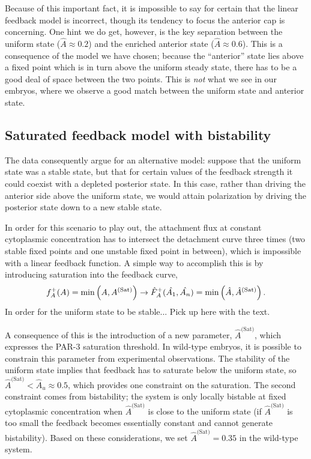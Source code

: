 \documentclass[11pt]{article}
\newcommand{\red}[1]{\color{red}#1\normalcolor}
\newcommand{\6}[1]{#1_{\text{6}}}
\newcommand{\3}[1]{#1_{\text{3}}}
\newcommand{\Sat}[1]{#1^\text{(Sat)}}
\begin{document}
Because of this important fact, it is impossible to say for certain that the linear feedback model is incorrect, though its tendency to focus the anterior cap is concerning. One hint we do get, however, is the key separation between the uniform state ($\hat A \approx 0.2$) and the enriched anterior state ($\hat A \approx 0.6$). This is a consequence of the model we have chosen; because the ``anterior'' state lies above a fixed point which is in turn above the uniform steady state, there has to be a good deal of space between the two points. This is \emph{not} what we see in our embryos, where we observe a good match between the uniform state and anterior state.

\subsection{Saturated feedback model with bistability}
The data consequently argue for an alternative model: suppose that the uniform state was a stable state, but that for certain values of the feedback strength it could coexist with a depleted posterior state. In this case, rather than driving the anterior side above the uniform state, we would attain polarization by driving the posterior state down to a new stable state. 

In order for this scenario to play out, the attachment flux at constant cytoplasmic concentration has to intersect the detachment curve three times (two stable fixed points and one unstable fixed point in between), which is impossible with a linear feedback function. A simple way to accomplish this is by introducing saturation into the feedback curve,
\begin{equation}
\label{eq:FBmodel}
f_A^+(A) =\min\left(A,\Sat{A}\right) \rightarrow \hat F_A^+(\hat \MA, \hat \PA) = \min\left(\hat A, \Sat{\hat A}\right). 
\end{equation}
In order for the uniform state to be stable... \red{Pick up here with the text.}

A consequence of this is the introduction of a new parameter, $\Sat{\hat A}$, which expresses the PAR-3 saturation threshold. In wild-type embryos, it is possible to constrain this parameter from experimental observations. The stability of the uniform state implies that feedback has to saturate below the uniform state, so $\Sat{\hat A} < \hat A_u \approx 0.5$, which provides one constraint on the saturation. The second constraint comes from bistability; the system is only locally bistable at fixed cytoplasmic concentration when $\Sat{\hat A}$ is close to the uniform state (if $\Sat{\hat A}$ is too small the feedback becomes essentially constant and cannot generate bistability). Based on these considerations, we set $\Sat{\hat A}=0.35$ in the wild-type system. 
\end{document}
